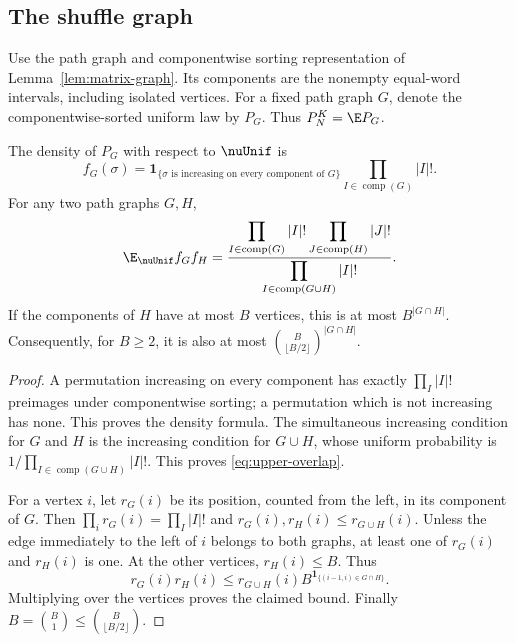 \subsection{The shuffle graph}
Use the path graph and componentwise sorting representation of
Lemma~\ref{lem:matrix-graph}. Its components are the nonempty
equal-word intervals, including isolated vertices. For a fixed path
graph $G$, denote the componentwise-sorted uniform law by $P_G$.
Thus $P_N^K=\E P_G$.

\begin{lemma}\label{lem:upper-overlap}
The density of $P_G$ with respect to $\nuUnif$ is
\[
 f_G(\sigma)=\mathbf1_{\{\sigma\text{ is increasing on every component of }G\}}
                   \prod_{I\in\operatorname{comp}(G)}|I|!.
\]
For any two path graphs $G,H$,
\begin{equation}\label{eq:upper-overlap}
 \E_{\nuUnif}f_G f_H
 =\frac{\displaystyle\prod_{I\in\operatorname{comp}(G)}|I|!
                    \prod_{J\in\operatorname{comp}(H)}|J|!}
          {\displaystyle\prod_{I\in\operatorname{comp}(G\cup H)}|I|!}.
\end{equation}
If the components of $H$ have at most $B$ vertices, this is at most
$B^{|G\cap H|}$. Consequently, for $B\ge2$, it is also at most
$\binom B{\lfloor B/2\rfloor}^{|G\cap H|}$.
\end{lemma}
\begin{proof}
A permutation increasing on every component has exactly
$\prod_I|I|!$ preimages under componentwise sorting; a permutation
which is not increasing has none. This proves the density formula.
The simultaneous increasing condition for $G$ and $H$ is the increasing
condition for $G\cup H$, whose uniform probability is
$1/\prod_{I\in\operatorname{comp}(G\cup H)}|I|!$. This proves
\eqref{eq:upper-overlap}.

For a vertex $i$, let $r_G(i)$ be its position, counted from the left,
in its component of $G$. Then $\prod_i r_G(i)=\prod_I|I|!$ and
$r_G(i),r_H(i)\le r_{G\cup H}(i)$. Unless the edge immediately to
the left of $i$ belongs to both graphs, at least one of $r_G(i)$ and
$r_H(i)$ is one. At the other vertices, $r_H(i)\le B$. Thus
\[
 r_G(i)r_H(i)\le r_{G\cup H}(i)
       B^{\mathbf1_{\{(i-1,i)\in G\cap H\}}}.
\]
Multiplying over the vertices proves the claimed bound. Finally
$B=\binom B1\le\binom B{\lfloor B/2\rfloor}$.
\end{proof}

